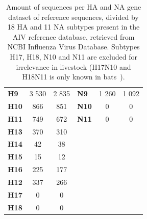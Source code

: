 \begin{table}[ht!]
\begin{tabular}{@{}lcclcc@{}}
	\textbf{H9}  & 3 530        & 2 835        & \textbf{N9}  & 1 260        & 1 092        \\
	\textbf{H10} & 866          & 851          & \textbf{N10} & 0            & 0            \\
	\textbf{H11} & 749          & 672          & \textbf{N11} & 0            & 0            \\
	\textbf{H13} & 370          & 310          &              &              &              \\
	\textbf{H14} & 42           & 38           &              &              &              \\
	\textbf{H15} & 15           & 12           &              &              &              \\
	\textbf{H16} & 225          & 177          &              &              &              \\
	\textbf{H12} & 337          & 266          &              &              &              \\
	\textbf{H17} & 0            & 0            &              &              &              \\
	\textbf{H18} & 0            & 0            &              &              &              \\ \hline
	\end{tabular}
	\caption[AIV reference collection by HA and NA subtypes.]{Amount of sequences per HA and NA gene dataset of reference sequences, divided by 18 HA and 11 NA subtypes present in the AIV reference database, retrieved from NCBI Influenza Virus Database. Subtypes H17, H18, N10 and N11 are excluded for irrelevance in livestock (H17N10 and H18N11 is only known in bats~\cite{tong2013new}).}
\label{tab:apx-aiv-ref-subtypes}
\end{table}


